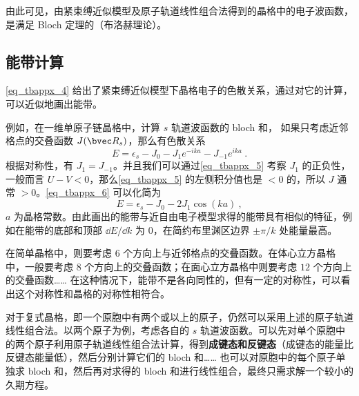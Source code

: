 由此可见，由紧束缚近似模型及原子轨道线性组合法得到的晶格中的电子波函数，是满足 Bloch 定理的（布洛赫理论）。

\subsection{能带计算}
\autoref{eq_tbappx_4} 给出了紧束缚近似模型下晶格电子的色散关系，通过对它的计算，可以近似地画出能带。

例如，在一维单原子链晶格中，计算 $s$ 轨道波函数的 bloch 和， 如果只考虑近邻格点的交叠函数 $J(\bvec R_s)$，那么有色散关系
\begin{equation}\label{eq_tbappx_6}
E=\epsilon_s-J_0-J_1 e^{-i k a}-J_{-1}e^{ika}~.
\end{equation}
根据对称性，有 $J_1=J_{-1}$。并且我们可以通过\autoref{eq_tbappx_5} 考察 $J_1$ 的正负性，一般而言 $U-V<0$，那么\autoref{eq_tbappx_5} 的左侧积分值也是 $<0$ 的，所以 $J$ 通常 $>0$。\autoref{eq_tbappx_6} 可以化简为
\begin{equation}
E=\epsilon_s-J_0-2J_1\cos(ka)~,
\end{equation}
$a$ 为晶格常数。由此画出的能带与近自由电子模型求得的能带具有相似的特征，例如在能带的底部和顶部 $\dd E/\dd k$ 为 $0$，在简约布里渊区边界 $\pm \pi/k$ 处能量最高。

在简单晶格中，则要考虑 $6$ 个方向上与近邻格点的交叠函数。在体心立方晶格中，一般要考虑 $8$ 个方向上的交叠函数；在面心立方晶格中则要考虑 $12$ 个方向上的交叠函数…… 在这种情况下，能带不是各向同性的，但有一定的对称性，可以看出这个对称性和晶格的对称性相符合。

对于复式晶格，即一个原胞中有两个或以上的原子，仍然可以采用上述的原子轨道线性组合法。以两个原子为例，考虑各自的 $s$ 轨道波函数。可以先对单个原胞中的两个原子利用原子轨道线性组合法计算，得到\textbf{成键态和反键态}（成键态的能量比反键态能量低），然后分别计算它们的 bloch 和…… 也可以对原胞中的每个原子单独求 bloch 和，然后再对求得的 bloch 和进行线性组合，最终只需求解一个较小的久期方程。